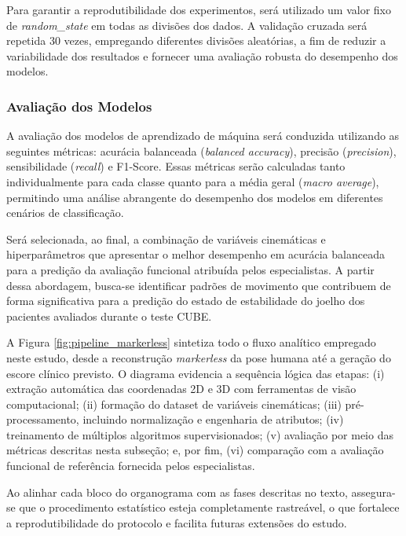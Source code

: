 \documentclass{article}
\begin{document}
Para garantir a reprodutibilidade dos experimentos, será utilizado um valor fixo de \textit{random\_state} em todas as divisões dos dados. A validação cruzada será repetida 30 vezes, empregando diferentes divisões aleatórias, a fim de reduzir a variabilidade dos resultados e fornecer uma avaliação robusta do desempenho dos modelos.




\subsubsection{Avaliação dos Modelos}

\noindent A avaliação dos modelos de aprendizado de máquina será conduzida utilizando as seguintes métricas: acurácia balanceada (\textit{balanced accuracy}), precisão (\textit{precision}), sensibilidade (\textit{recall}) e F1-Score. Essas métricas serão calculadas tanto individualmente para cada classe quanto para a média geral (\textit{macro average}), permitindo uma análise abrangente do desempenho dos modelos em diferentes cenários de classificação.

Será selecionada, ao final, a combinação de variáveis cinemáticas e hiperparâmetros que apresentar o melhor desempenho em acurácia balanceada para a predição da avaliação funcional atribuída pelos especialistas. A partir dessa abordagem, busca-se identificar padrões de movimento que contribuem de forma significativa para a predição do estado de estabilidade do joelho dos pacientes avaliados durante o teste CUBE.

A Figura \ref{fig:pipeline_markerless} sintetiza todo o fluxo analítico empregado neste estudo, desde a reconstrução \textit{markerless} da pose humana até a geração do escore clínico previsto. O diagrama evidencia a sequência lógica das etapas: (i) extração automática das coordenadas 2D e 3D com ferramentas de visão computacional; (ii) formação do dataset de variáveis cinemáticas; (iii) pré-processamento, incluindo normalização e engenharia de atributos; (iv) treinamento de múltiplos algoritmos supervisionados; (v) avaliação por meio das métricas descritas nesta subseção; e, por fim, (vi) comparação com a avaliação funcional de referência fornecida pelos especialistas.

Ao alinhar cada bloco do organograma com as fases descritas no texto, assegura-se que o procedimento estatístico esteja completamente rastreável, o que fortalece a reprodutibilidade do protocolo e facilita futuras extensões do estudo.
\end{document}
